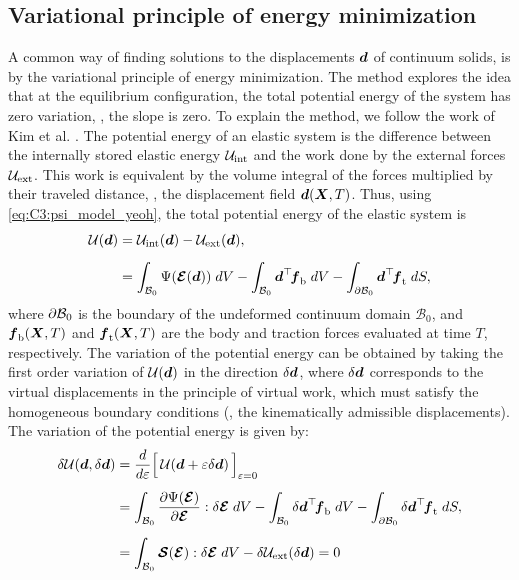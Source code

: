 
\subsection{Variational principle of energy minimization}
A common way of finding solutions to the displacements ${\boldsymbol{d}}$ of continuum solids, is by the variational principle of energy minimization. The method explores the idea that at the equilibrium configuration, the total potential energy of the system has zero variation, \ie, the slope is zero. To explain the method, we follow the work of Kim et al. \cite{Kim2018}. The potential energy of an elastic system is the difference between the internally stored elastic energy $\mathcal{U}_{\textrm{int}}$ and the work done by the external forces $\mathcal{U}_{\textrm{ext}}$. This work is equivalent by the volume integral of the forces multiplied by their traveled distance, \ie, the displacement field ${\boldsymbol{d}}({\boldsymbol{X}},T)$. Thus, using \eqref{eq:C3:psi_model_yeoh}, the total potential energy of the elastic system is
%
\begin{align}
\mathcal{U}({\boldsymbol{d}}) &= \mathcal{U}_{\textrm{int}}({\boldsymbol{d}}) - \mathcal{U}_{\textrm{ext}}({\boldsymbol{d}}),  \notag\\[0.5em]
& = \int_{\mathcal{B}_0} \Psi(\boldsymbol{\mathcal{E}}({\boldsymbol{d}})) \; dV -  \int_{\mathcal{B}_0} {\boldsymbol{d}}^\top \!{\boldsymbol{f}}_{\textrm{b}}   \; dV - \int_{\partial \mathcal{B}_0} {\boldsymbol{d}}^\top \!{\boldsymbol{f}}_{\textrm{t}} \; dS,
\end{align}
%
where $\partial \mathcal{B}_0$ is the boundary of the undeformed continuum domain $\mathcal{B}_0$, and ${\boldsymbol{f}}_{\textrm{b}}({\boldsymbol{X}},T)$ and ${\boldsymbol{f}}_{\textrm{t}}({\boldsymbol{X}},T)$ are the body and traction forces evaluated at time $T$, respectively. The variation of the potential energy can be obtained by taking the first order variation of $\mathcal{U}({\boldsymbol{d}})$ in the direction $\delta {\boldsymbol{d}}$, where $\delta {\boldsymbol{d}}$ corresponds to the virtual displacements in the principle of virtual work, which must satisfy the homogeneous boundary conditions (\ie, the kinematically admissible displacements).  The variation of the potential energy is given by:
%
\begin{align}
\delta \mathcal{U} ({\boldsymbol{d}}, \delta {\boldsymbol{d}}) & =  \frac{d}{d\varepsilon} \Big[ \,\mathcal{U} ({\boldsymbol{d}} + \varepsilon \delta {\boldsymbol{d}}) \, \Big]_{\varepsilon = 0} \notag \\[0.5em]
& =  \int_{\mathcal{B}_0} \frac{\partial \Psi(\boldsymbol{\mathcal{E}})}{\partial \boldsymbol{\mathcal{E}}} : \delta \boldsymbol{\mathcal{E}} \; dV - \int_{\mathcal{B}_0}  \delta {\boldsymbol{d}}^\top \! {\boldsymbol{f}}_{\textrm{b}} \; dV - \int_{\partial \mathcal{B}_0}  \delta {\boldsymbol{d}}^\top \! {\boldsymbol{f}}_{\textrm{t}}  \; dS, \notag \\[0.5em]
& =  \int_{\mathcal{B}_0}\boldsymbol{\mathcal{S}}(\boldsymbol{\mathcal{E}}) : \delta \boldsymbol{\mathcal{E}} \; dV - \delta \mathcal{U}_{\textrm{ext}}(\delta {\boldsymbol{d}}) = 0
\end{align}
